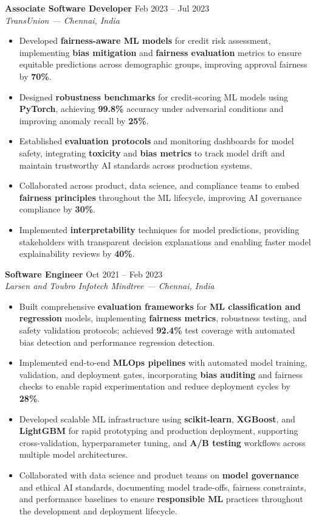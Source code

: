 \documentclass[11pt,a4paper]{article}
\newcommand{\jobentry}[3]{%
  \vspace{5pt}%
  \noindent\textbf{#1} \hfill #3\\%
  \textit{#2}%
}
\begin{document}
\jobentry{Associate Software Developer}{TransUnion — Chennai, India}{Feb 2023 -- Jul 2023}
\begin{itemize}
\item Developed \textbf{fairness-aware ML models} for credit risk assessment, implementing \textbf{bias mitigation} and \textbf{fairness evaluation} metrics to ensure equitable predictions across demographic groups, improving approval fairness by \textbf{70\%}.
\item Designed \textbf{robustness benchmarks} for credit-scoring ML models using \textbf{PyTorch}, achieving \textbf{99.8\%} accuracy under adversarial conditions and improving anomaly recall by \textbf{25\%}.
\item Established \textbf{evaluation protocols} and monitoring dashboards for model safety, integrating \textbf{toxicity} and \textbf{bias metrics} to track model drift and maintain trustworthy AI standards across production systems.
\item Collaborated across product, data science, and compliance teams to embed \textbf{fairness principles} throughout the ML lifecycle, improving AI governance compliance by \textbf{30\%}.
\item Implemented \textbf{interpretability} techniques for model predictions, providing stakeholders with transparent decision explanations and enabling faster model explainability reviews by \textbf{40\%}.
\end{itemize}

\jobentry{Software Engineer}{Larsen and Toubro Infotech Mindtree — Chennai, India}{Oct 2021 -- Feb 2023}
\begin{itemize}
\item Built comprehensive \textbf{evaluation frameworks} for \textbf{ML classification and regression} models, implementing \textbf{fairness metrics}, robustness testing, and safety validation protocols; achieved \textbf{92.4\%} test coverage with automated bias detection and performance regression detection.
\item Implemented end-to-end \textbf{MLOps pipelines} with automated model training, validation, and deployment gates, incorporating \textbf{bias auditing} and fairness checks to enable rapid experimentation and reduce deployment cycles by \textbf{28\%}.
\item Developed scalable ML infrastructure using \textbf{scikit-learn}, \textbf{XGBoost}, and \textbf{LightGBM} for rapid prototyping and production deployment, supporting cross-validation, hyperparameter tuning, and \textbf{A/B testing} workflows across multiple model architectures.
\item Collaborated with data science and product teams on \textbf{model governance} and ethical AI standards, documenting model trade-offs, fairness constraints, and performance baselines to ensure \textbf{responsible ML} practices throughout the development and deployment lifecycle.
\end{itemize}
\end{document}

